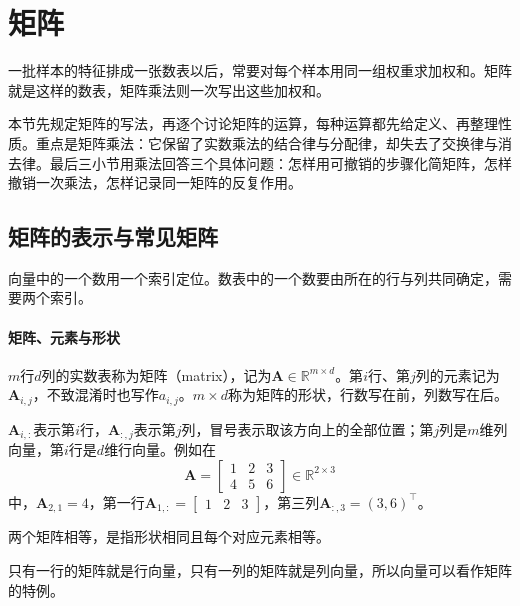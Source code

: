 
\section{矩阵}
\label{sec:ls-matrices}

一批样本的特征排成一张数表以后，常要对每个样本用同一组权重求加权和。矩阵就是这样的数表，矩阵乘法则一次写出这些加权和。

本节先规定矩阵的写法，再逐个讨论矩阵的运算，每种运算都先给定义、再整理性质。重点是矩阵乘法：它保留了实数乘法的结合律与分配律，却失去了交换律与消去律。最后三小节用乘法回答三个具体问题：怎样用可撤销的步骤化简矩阵，怎样撤销一次乘法，怎样记录同一矩阵的反复作用。

\subsection{矩阵的表示与常见矩阵}
\label{sec:ls-matrix-representation}

向量中的一个数用一个索引定位。数表中的一个数要由所在的行与列共同确定，需要两个索引。

\paragraph{矩阵、元素与形状}
$m$行$d$列的实数表称为矩阵（matrix），记为$\bm A\in\mathbb R^{m\times d}$。第$i$行、第$j$列的元素记为$\bm A_{i,j}$，不致混淆时也写作$a_{i,j}$。$m\times d$称为矩阵的形状，行数写在前，列数写在后。

$\bm A_{i,:}$表示第$i$行，$\bm A_{:,j}$表示第$j$列，冒号表示取该方向上的全部位置；第$j$列是$m$维列向量，第$i$行是$d$维行向量。例如在
\[
 \bm A=\begin{bmatrix}1&2&3\\4&5&6\end{bmatrix}\in\mathbb R^{2\times3}
\]
中，$\bm A_{2,1}=4$，第一行$\bm A_{1,:}=\left[\begin{smallmatrix}1&2&3\end{smallmatrix}\right]$，第三列$\bm A_{:,3}=(3,6)^\top$。

两个矩阵相等，是指形状相同且每个对应元素相等。

只有一行的矩阵就是行向量，只有一列的矩阵就是列向量，所以向量可以看作矩阵的特例。

